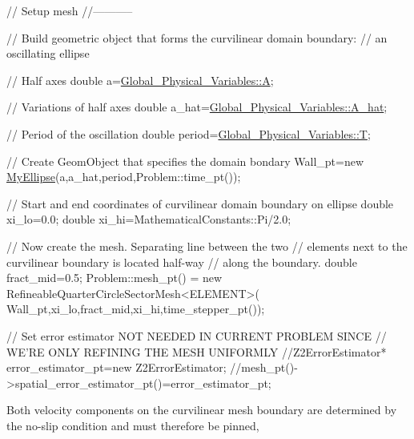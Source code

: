 \begin{DoxyCodeInclude}

 \textcolor{comment}{// Setup mesh}
 \textcolor{comment}{//-----------}

 \textcolor{comment}{// Build geometric object that forms the curvilinear domain boundary:}
 \textcolor{comment}{// an oscillating ellipse}

 \textcolor{comment}{// Half axes}
 \textcolor{keywordtype}{double} a=\hyperlink{namespaceGlobal__Physical__Variables_a4894f9a3a9cbf84f00d0719f2841e624}{Global\_Physical\_Variables::A};

 \textcolor{comment}{// Variations of half axes}
 \textcolor{keywordtype}{double} a\_hat=\hyperlink{namespaceGlobal__Physical__Variables_a11d1e77201d6b8c250c4c9396fc5ad06}{Global\_Physical\_Variables::A\_hat};

 \textcolor{comment}{// Period of the oscillation}
 \textcolor{keywordtype}{double} period=\hyperlink{namespaceGlobal__Physical__Variables_a1a806ee7c4d04d6afaba1d24d94dceea}{Global\_Physical\_Variables::T};

 \textcolor{comment}{// Create GeomObject that specifies the domain bondary}
 Wall\_pt=\textcolor{keyword}{new} \hyperlink{classMyEllipse}{MyEllipse}(a,a\_hat,period,Problem::time\_pt()); 


 \textcolor{comment}{// Start and end coordinates of curvilinear domain boundary on ellipse}
 \textcolor{keywordtype}{double} xi\_lo=0.0;
 \textcolor{keywordtype}{double} xi\_hi=MathematicalConstants::Pi/2.0;

 \textcolor{comment}{// Now create the mesh. Separating line between the two }
 \textcolor{comment}{// elements next to the curvilinear boundary is located half-way}
 \textcolor{comment}{// along the boundary.}
 \textcolor{keywordtype}{double} fract\_mid=0.5;
 Problem::mesh\_pt() = \textcolor{keyword}{new} RefineableQuarterCircleSectorMesh<ELEMENT>(
  Wall\_pt,xi\_lo,fract\_mid,xi\_hi,time\_stepper\_pt());

 \textcolor{comment}{// Set error estimator NOT NEEDED IN CURRENT PROBLEM SINCE }
 \textcolor{comment}{// WE'RE ONLY REFINING THE MESH UNIFORMLY}
 \textcolor{comment}{//Z2ErrorEstimator* error\_estimator\_pt=new Z2ErrorEstimator;}
 \textcolor{comment}{//mesh\_pt()->spatial\_error\_estimator\_pt()=error\_estimator\_pt;}

\end{DoxyCodeInclude}


Both velocity components on the curvilinear mesh boundary are determined by the no-\/slip condition and must therefore be pinned,


